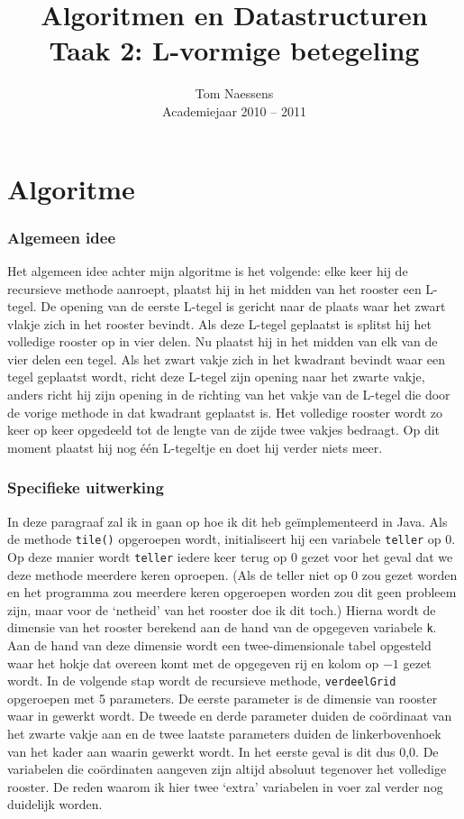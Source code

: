 \documentclass[12pt,a4paper]{report}
\title{Algoritmen en Datastructuren\\ Taak 2: L-vormige betegeling}
\author{Tom Naessens\\ Academiejaar 2010 -- 2011}
\begin{document}
\maketitle

\section*{Algoritme}
\subsubsection*{Algemeen idee}
Het algemeen idee achter mijn algoritme is het volgende: elke keer hij de recursieve methode aanroept, plaatst hij in het midden van het rooster een L-tegel. De opening van de eerste L-tegel is gericht naar de plaats waar het zwart vlakje zich in het rooster bevindt. Als deze L-tegel geplaatst is splitst hij het volledige rooster op in vier delen. Nu plaatst hij in het midden van elk van de vier delen een tegel. Als het zwart vakje zich in het kwadrant bevindt waar een tegel geplaatst wordt, richt deze L-tegel zijn opening naar het zwarte vakje, anders richt hij zijn opening in de richting van het vakje van de L-tegel die door de vorige methode in dat kwadrant geplaatst is. Het volledige rooster wordt zo keer op keer opgedeeld tot de lengte van de zijde twee vakjes bedraagt. Op dit moment plaatst hij nog \'e\'en L-tegeltje en doet hij verder niets meer.

\subsubsection*{Specifieke uitwerking}
In deze paragraaf zal ik in gaan op hoe ik dit heb ge\"implementeerd in Java.
Als de methode \texttt{tile()} opgeroepen wordt, initialiseert hij een variabele \texttt{teller} op 0. Op deze manier wordt \texttt{teller} iedere keer terug op 0 gezet voor het geval dat we deze methode meerdere keren oproepen. (Als de teller niet op 0 zou gezet worden en het programma zou meerdere keren opgeroepen worden zou dit geen probleem zijn, maar voor de `netheid' van het rooster doe ik dit toch.)
Hierna wordt de dimensie van het rooster berekend aan de hand van de opgegeven variabele \texttt{k}. Aan de hand van deze dimensie wordt een twee-dimensionale tabel opgesteld waar het hokje dat overeen komt met de opgegeven rij en kolom op $-1$ gezet wordt.
In de volgende stap wordt de recursieve methode, \texttt{verdeelGrid} opgeroepen met 5 parameters. De eerste parameter is de dimensie van rooster waar in gewerkt wordt. De tweede en derde parameter duiden de co\"ordinaat van het zwarte vakje aan en de twee laatste parameters duiden de linkerbovenhoek van het kader aan waarin gewerkt wordt. In het eerste geval is dit dus $0$,$0$. De variabelen die co\"ordinaten aangeven zijn altijd absoluut tegenover het volledige rooster. De reden waarom ik hier twee `extra' variabelen in voer zal verder nog duidelijk worden.\\
\end{document}
